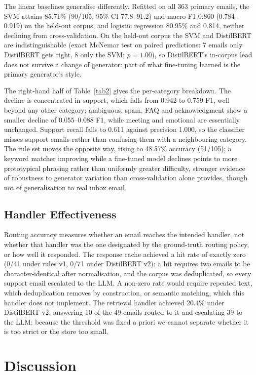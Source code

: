 \documentclass[conference]{IEEEtran}
\begin{document}
The linear baselines generalise differently. Refitted on all 363 primary emails, the SVM attains 85.71\% (90/105, 95\% CI 77.8--91.2) and macro-F1 0.860 (0.784--0.919) on the held-out corpus, and logistic regression 80.95\% and 0.814, neither declining from cross-validation. On the held-out corpus the SVM and DistilBERT are indistinguishable (exact McNemar test on paired predictions: 7 emails only DistilBERT gets right, 8 only the SVM; $p=1.00$), so DistilBERT's in-corpus lead does not survive a change of generator: part of what fine-tuning learned is the primary generator's style.

The right-hand half of Table~\ref{tab2} gives the per-category breakdown. The decline is concentrated in support, which falls from 0.942 to 0.759 F1, well beyond any other category; ambiguous, spam, FAQ and acknowledgment show a smaller decline of 0.055--0.088 F1, while meeting and emotional are essentially unchanged. Support recall falls to 0.611 against precision 1.000, so the classifier misses support emails rather than confusing them with a neighbouring category. The rule set moves the opposite way, rising to 48.57\% accuracy (51/105); a keyword matcher improving while a fine-tuned model declines points to more prototypical phrasing rather than uniformly greater difficulty, stronger evidence of robustness to generator variation than cross-validation alone provides, though not of generalisation to real inbox email.

\subsection{Handler Effectiveness}
Routing accuracy measures whether an email reaches the intended handler, not whether that handler was the one designated by the ground-truth routing policy, or how well it responded. The response cache achieved a hit rate of exactly zero (0/41 under rules v1, 0/71 under DistilBERT v2): a hit requires two emails to be character-identical after normalisation, and the corpus was deduplicated, so every support email escalated to the LLM. A non-zero rate would require repeated text, which deduplication removes by construction, or semantic matching, which this handler does not implement. The retrieval handler achieved 20.4\% under DistilBERT v2, answering 10 of the 49 emails routed to it and escalating 39 to the LLM; because the threshold was fixed a priori we cannot separate whether it is too strict or the store too small.

\section{Discussion}
\end{document}
